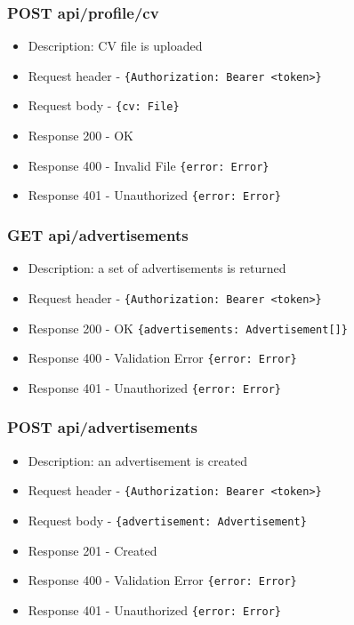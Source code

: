 \subsubsection{POST api/profile/cv}
\begin{itemize}
    \item Description: CV file is uploaded
    \item Request header - \verb|{Authorization: Bearer <token>}|
    \item Request body - \verb|{cv: File}|
    \item Response 200 - OK
    \item Response 400 - Invalid File \verb|{error: Error}|
    \item Response 401 - Unauthorized \verb|{error: Error}|
\end{itemize}

\subsubsection{GET api/advertisements}
\begin{itemize}
    \item Description: a set of advertisements is returned
    \item Request header - \verb|{Authorization: Bearer <token>}|
    \item Response 200 - OK \verb|{advertisements: Advertisement[]}|
    \item Response 400 - Validation Error \verb|{error: Error}|
    \item Response 401 - Unauthorized \verb|{error: Error}|
\end{itemize}

\subsubsection{POST api/advertisements}
\begin{itemize}
    \item Description: an advertisement is created
    \item Request header - \verb|{Authorization: Bearer <token>}|
    \item Request body - \verb|{advertisement: Advertisement}|
    \item Response 201 - Created
    \item Response 400 - Validation Error \verb|{error: Error}|
    \item Response 401 - Unauthorized \verb|{error: Error}|
\end{itemize}

